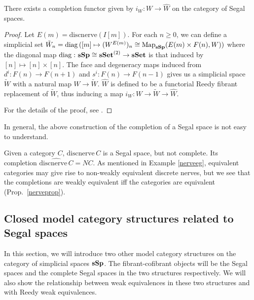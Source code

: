 \begin{refsection}
\begin{prop}
There exists a completion functor given by $i_W:W\to\hat W$ on the category of Segal spaces.
\end{prop}
\begin{proof}
Let $E(m)=\mathrm{discnerve}(I[m])$. For each $n \ge 0$, we can define a simplicial set $\tilde W_n=\operatorname{\mathrm{diag} \,}([m]\mapsto (W^{E(m)})_n \cong \operatorname{\mathrm{Map}}_{\mathbf{sSp}}(E(m)\times F(n),W))$ where the diagonal map $\operatorname{\mathrm{diag} \,} \colon \mathbf{sSp}\cong\mathbf{sSet}^{(2)}\to\mathbf{sSet}$ is that induced by $[n]\mapsto[n]\times[n]$. The face and degeneracy maps induced from $d^i \colon F(n)\to F(n+1)$ and $s^i \colon F(n)\to F(n-1)$ gives us a simplicial space $\tilde W$ with a natural map $W\to \tilde W$. $\hat W$ is defined to be a functorial Reedy fibrant replacement of $\tilde W$, thus inducing a map $i_W:W\to\tilde W\to\hat W$.

For the details of the proof, see \cite{rezk}.
\end{proof}

In general, the above construction of the completion of a Segal space is not easy to understand.

\begin{eg}\label{nervecomplete}
Given a category $C$, $\mathrm{discnerve}\,C$ is a Segal space, but not complete. Its completion $\widehat{\mathrm{discnerve}\,C}=NC$. As mentioned in Example \ref{nerveeg}, equivalent categories may give rise to non-weakly equivalent discrete nerves, but we see that the completions are weakly equivalent iff the categories are equivalent (Prop.~\ref{nerveprop}).
\end{eg}

\subsection{Closed model category structures related to Segal spaces}
In this section, we will introduce two other model category structures on the category of simplicial spaces $\mathbf{sSp}$. The fibrant-cofibrant objects will be the Segal spaces and the complete Segal spaces in the two structures respectively. We will also show the relationship between weak equivalences in these two structures and with Reedy weak equivalences.


\end{refsection}
